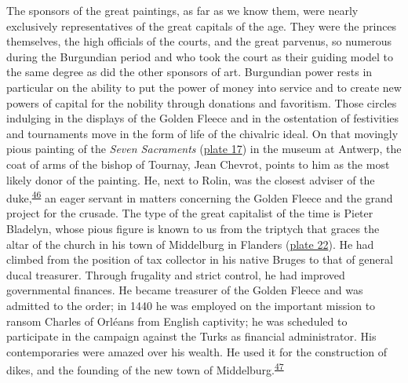 The sponsors of the great paintings, as far as we know them, were nearly
exclusively representatives of the great capitals of the age. They were
the princes themselves, the high officials of the courts, and the great
parvenus, so numerous during the Burgundian period and who took the
court as their guiding model to the same degree as did the other
sponsors of art. Burgundian power rests in particular on the ability to
put the power of money into service and to create new powers of capital
for the nobility through donations and favoritism. Those circles
indulging in the displays of the Golden Fleece and in the ostentation of
festivities and tournaments move in the form of life of the chivalric
ideal. On that movingly pious painting of the \emph{Seven Sacraments}
(\protect\hyperlink{20_ILLUSTRATIONS_FOLLOW_PAGE.xhtmlux5cux23id_17}{plate
17}) in the museum at Antwerp, the coat of arms of the bishop of
Tournay, Jean Chevrot, points to him as the most likely donor of the
painting. He, next to Rolin, was the closest adviser of the
duke,\textsuperscript{\protect\hypertarget{20_ILLUSTRATIONS_FOLLOW_PAGE.xhtmlux5cux23id_381}{\protect\hyperlink{23_NOTES.xhtmlux5cux23id_382}{46}}}
an eager servant in matters concerning the Golden Fleece and the grand
project for the crusade. The type of the great capitalist of the time is
Pieter Bladelyn, whose pious figure is known to us from the triptych
that graces the altar of the church in his town of Middelburg in
Flanders
(\protect\hyperlink{20_ILLUSTRATIONS_FOLLOW_PAGE.xhtmlux5cux23id_21}{plate
22}). He had climbed from the position of tax collector in his native
Bruges to that of general ducal treasurer. Through frugality and strict
control, he had improved governmental finances. He became treasurer of
the Golden Fleece and was admitted to the order; in 1440 he was employed
on the important mission to ransom Charles of Orléans from English
captivity; he was scheduled to participate in the campaign against the
Turks as financial administrator. His contemporaries were amazed over
his wealth. He used it for the construction of dikes, and the founding
of the new town of
Middelburg.\textsuperscript{\protect\hypertarget{20_ILLUSTRATIONS_FOLLOW_PAGE.xhtmlux5cux23id_379}{\protect\hyperlink{23_NOTES.xhtmlux5cux23id_380}{47}}}

